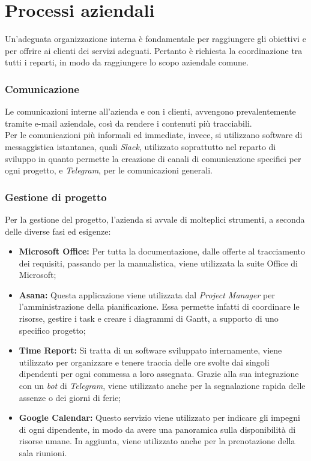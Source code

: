 \section{Processi aziendali}
Un'adeguata organizzazione interna è fondamentale per raggiungere gli obiettivi e per offrire ai clienti dei servizi adeguati. Pertanto è richiesta la coordinazione tra tutti i reparti, in modo da raggiungere lo scopo aziendale comune.

\subsubsection*{Comunicazione}
Le comunicazioni interne all'azienda e con i clienti, avvengono prevalentemente tramite e-mail aziendale, così da rendere i contenuti più tracciabili.\\
Per le comunicazioni più informali ed immediate, invece, si utilizzano software di messaggistica istantanea, quali \textit{Slack}, utilizzato soprattutto nel reparto di sviluppo in quanto permette la creazione di canali di comunicazione specifici per ogni progetto, e \textit{Telegram}, per le comunicazioni generali.

\subsubsection*{Gestione di progetto}
Per la gestione del progetto, l'azienda si avvale di molteplici strumenti, a seconda delle diverse fasi ed esigenze:
\begin{itemize}

\item \textbf{Microsoft Office:} Per tutta la documentazione, dalle offerte al tracciamento dei requisiti, passando per la manualistica, viene utilizzata la suite Office di Microsoft;

\item \textbf{Asana:} Questa applicazione viene utilizzata dal \textit{Project Manager} per l'amministrazione della pianificazione. Essa permette infatti di coordinare le risorse, gestire i task e creare i diagrammi di Gantt, a supporto di uno specifico progetto;

\item \textbf{Time Report:} Si tratta di un software sviluppato internamente, viene utilizzato per organizzare e tenere traccia delle ore svolte dai singoli dipendenti per ogni commessa a loro assegnata. Grazie alla sua integrazione con un \textit{bot} di \textit{Telegram}, viene utilizzato anche per la segnalazione rapida delle assenze o dei giorni di ferie;

\item \textbf{Google Calendar:} Questo servizio viene utilizzato per indicare gli impegni di ogni dipendente, in modo da avere una panoramica sulla disponibilità di risorse umane. In aggiunta, viene utilizzato anche per la prenotazione della sala riunioni.
\end{itemize}

